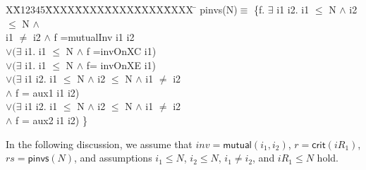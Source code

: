 \documentclass[conference]{IEEEtran}
\newlength{\fminilength}
\newenvironment{fmini}[1][\linewidth]
  {\setlength{\fminilength}{#1\fboxsep-2\fboxrule}%
   \vspace{2ex}\noindent\begin{lrbox}{\fminibox}\begin{minipage}{\fminilength}%
   \mbox{ }\hfill\vspace{-2.5ex}}%
  {\end{minipage}\end{lrbox}\vspace{1ex}\hspace{0ex}%
   \framebox{\usebox{\fminibox}}}
\newenvironment{specification}
{\noindent\scriptsize
\tt\begin{fmini}\begin{tabbing}X\=X12345\=XXXX\=XXXX\=XXXX\=XXXX\=XXXX
\=\+\kill} {\end{tabbing}\normalfont\end{fmini}}
\def \eqc {\doteq }
\def \andc {\barwedge }
\def \negc {!}
\def \iInv {i}
\begin{document}
{\begin{example}
\begin{specification}
  pinvs(N)$\equiv$ \{f. $\exists$ \iInv1 \iInv2. \iInv1 $\le$ N $\wedge$ \iInv2 $\le$ N $\wedge$\\
   \iInv1 $\ne$ \iInv2 $\wedge$   f =mutualInv   \iInv1 \iInv2 \\
 $ \vee(\exists$ \iInv1. \iInv1 $\le$ N $\wedge$  f =invOnXC  \iInv1)   \\
$\vee(\exists$ \iInv1. \iInv1 $\le$ N $\wedge$  f= invOnXE \iInv1)    \\
$\vee(\exists$ \iInv1 \iInv2. \iInv1 $\le$ N $\wedge$ \iInv2 $\le$ N $\wedge$ \iInv1 $\ne$ \iInv2 \\
$\wedge$ f =  aux1  \iInv1 \iInv2) \\
$\vee(\exists$ \iInv1 \iInv2. \iInv1 $\le$ N $\wedge$ \iInv2 $\le$ N $\wedge$ \iInv1 $\ne$ \iInv2 \\
$\wedge$ f =  aux2  \iInv1 \iInv2) \}

\end{specification}

In the following discussion, we assume that $inv=\mathsf{mutual} (i_1,i_2)$, $r=\mathsf{crit}(iR_1)$, $rs= \mathsf{pinvs} (N)$, and   assumptions  $i_1 \leq N$, $i_2 \leq N$, $i_1 \neq i_2$, and $iR_1 \leq N$ hold.

\begin{itemize}[leftmargin=12pt,noitemsep,nolistsep]




\end{itemize}
\end{example}}
\end{document}
